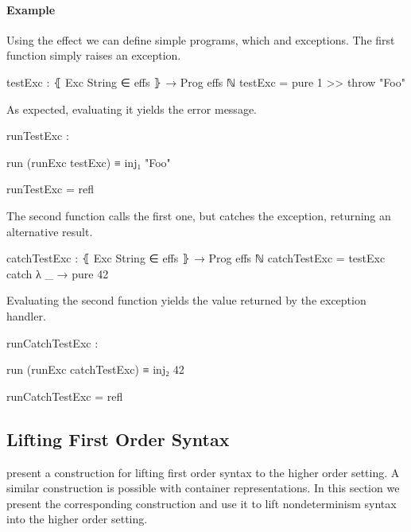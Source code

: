\paragraph{Example}
Using the  effect we can define simple programs, which
 and  exceptions.
The first function simply raises an exception.
\begin{code}
testExc : ⦃ Exc String ∈ effs ⦄ → Prog effs ℕ
testExc = pure 1 >> throw "Foo"
\end{code}
As expected, evaluating it yields the error message.
\begin{center}
\begin{code}
runTestExc :
\end{code}
\begin{code}[inline]
 run (runExc testExc) ≡ inj₁ "Foo"
\end{code}
\begin{code}
runTestExc = refl
\end{code}
\end{center}
The second function calls the first one, but catches the exception, returning an
alternative result.
\begin{code}
catchTestExc : ⦃ Exc String ∈ effs ⦄ → Prog effs ℕ
catchTestExc = testExc catch λ _ → pure 42
\end{code}
Evaluating the second function yields the value returned by the exception
handler.
\begin{center}
\begin{code}
runCatchTestExc :
\end{code}
\begin{code}[inline]
 run (runExc catchTestExc) ≡ inj₂ 42
\end{code}
\begin{code}
runCatchTestExc = refl
\end{code}
\end{center}


\subsection{Lifting First Order Syntax}
\label{higher-order:lifting}

\textcite{DBLP:conf/haskell/WuSH14} present a construction for lifting first
order syntax to the higher order setting.
A similar construction is possible with container representations.
In this section we present the corresponding construction and use it to
lift nondeterminism syntax into the higher order setting. 

